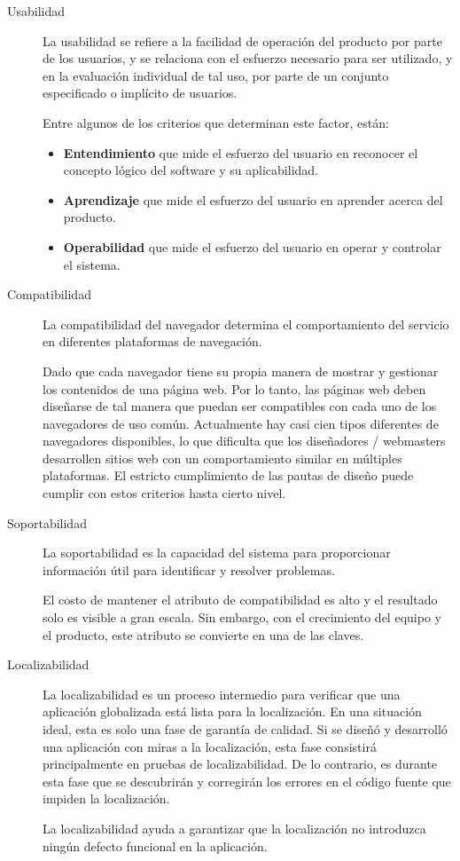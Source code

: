 \begin{description}
\item [Usabilidad] La usabilidad se refiere a la facilidad de operación del
    producto por parte de los usuarios, y se relaciona con el esfuerzo
    necesario para ser utilizado, y en la evaluación individual de tal uso, por
    parte de un conjunto especificado o implícito de usuarios.

    Entre algunos de los criterios que determinan este factor, están:

    \begin{itemize}
    \item \textbf{Entendimiento} que mide el esfuerzo del usuario en reconocer el
        concepto lógico del software y su aplicabilidad.
    \item \textbf{Aprendizaje} que mide el esfuerzo del usuario en aprender
        acerca del producto.
    \item \textbf{Operabilidad} que mide el esfuerzo del usuario en operar y
        controlar el sistema.
    \end{itemize}

\item [Compatibilidad] La compatibilidad del navegador determina el
    comportamiento del servicio en diferentes plataformas de navegación.

    Dado que cada navegador tiene su propia manera de mostrar y gestionar los
    contenidos de una página web. Por lo tanto, las páginas web deben diseñarse
    de tal manera que puedan ser compatibles con cada uno de los navegadores de
    uso común. Actualmente hay casi cien tipos diferentes de navegadores
    disponibles, lo que dificulta que los diseñadores / webmasters desarrollen
    sitios web con un comportamiento similar en múltiples plataformas. El
    estricto cumplimiento de las pautas de diseño puede cumplir con estos
    criterios hasta cierto nivel.

\item [Soportabilidad] La soportabilidad es la capacidad del sistema para
    proporcionar información útil para identificar y resolver problemas.

    El costo de mantener el atributo de compatibilidad es alto y el resultado
    solo es visible a gran escala. Sin embargo, con el crecimiento del equipo y
    el producto, este atributo se convierte en una de las claves\cite{Ashanin}.

\item [Localizabilidad] La localizabilidad es un proceso intermedio para
    verificar que una aplicación globalizada está lista para la localización.
    En una situación ideal, esta es solo una fase de garantía de calidad. Si se
    diseñó y desarrolló una aplicación con miras a la localización, esta fase
    consistirá principalmente en pruebas de localizabilidad. De lo contrario, es
    durante esta fase que se descubrirán y corregirán los errores en el código
    fuente que impiden la localización.

    La localizabilidad ayuda a garantizar que la localización no introduzca
    ningún defecto funcional en la aplicación\cite{Moura}.
\end{description}

